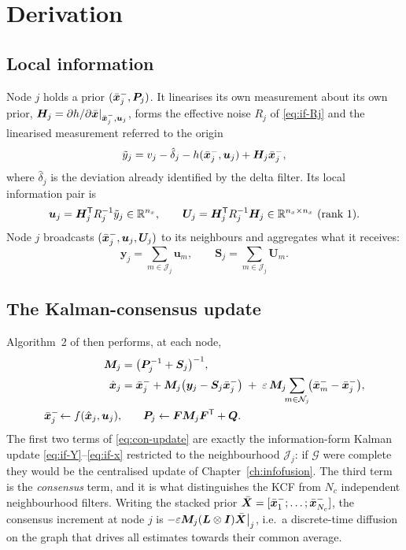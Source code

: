 \section{Derivation}

\subsection{Local information}
Node $j$ holds a prior $(\bar{\bm{x}}_j^-,\bm{P}_j)$. It linearises its own measurement about its own
prior, $\bm{H}_j = \partial h/\partial\bar{\bm{x}}|_{\bar{\bm{x}}_j^-,\bm{u}_j}$, forms the effective noise
$R_j$ of \eqref{eq:if-Rj} and the linearised measurement referred to the origin
\begin{equation}
\tilde y_j = v_j - \hat\delta_j - h(\bar{\bm{x}}_j^-,\bm{u}_j) + \bm{H}_j\bar{\bm{x}}_j^- ,
\label{eq:con-ytilde}
\end{equation}
where $\hat\delta_j$ is the deviation already identified by the delta filter. Its local
information pair is
\begin{equation}
\bm{u}_j = \bm{H}_j^{\mathsf{T}} R_j^{-1} \tilde y_j \in\mathbb{R}^{n_x},\qquad
\bm{U}_j = \bm{H}_j^{\mathsf{T}} R_j^{-1} \bm{H}_j \in\mathbb{R}^{n_x\times n_x}\ (\text{rank }1).
\label{eq:con-uU}
\end{equation}
Node $j$ broadcasts $(\bar{\bm{x}}_j^-, \bm{u}_j, \bm{U}_j)$ to its neighbours and aggregates what it
receives:
\begin{equation}
\bm{y}_j = \sum_{m\in\mathcal{J}_j}\bm{u}_m ,\qquad
\bm{S}_j = \sum_{m\in\mathcal{J}_j}\bm{U}_m .
\label{eq:con-agg}
\end{equation}

\subsection{The Kalman-consensus update}
Algorithm~2 of \cite{olfatisaber2007dkf} then performs, at each node,
\begin{align}
\bm{M}_j &= \big(\bm{P}_j^{-1} + \bm{S}_j\big)^{-1} , \label{eq:con-M}\\
\hat{\bm{x}}_j &= \bar{\bm{x}}_j^- + \bm{M}_j\big(\bm{y}_j - \bm{S}_j\bar{\bm{x}}_j^-\big)
 \;+\; \varepsilon\,\bm{M}_j\!\!\sum_{m\in\mathcal{N}_j}\!\!\big(\bar{\bm{x}}_m^- - \bar{\bm{x}}_j^-\big),
 \label{eq:con-update}\\
\bar{\bm{x}}_j^-\!\leftarrow f(\hat{\bm{x}}_j,\bm{u}_j),&\qquad \bm{P}_j \leftarrow \bm{F}\bm{M}_j\bm{F}^{\mathsf{T}} + \bm{Q} .
\label{eq:con-prop}
\end{align}
The first two terms of \eqref{eq:con-update} are exactly the information-form Kalman update
\eqref{eq:if-Y}--\eqref{eq:if-x} restricted to the neighbourhood $\mathcal{J}_j$: if
$\mathcal{G}$ were complete they would be the centralised update of Chapter~\ref{ch:infofusion}.
The third term is the \emph{consensus} term, and it is what distinguishes the KCF from $N_c$
independent neighbourhood filters. Writing the stacked prior
$\bar{\bm{X}}=[\bar{\bm{x}}_1^-;\dots;\bar{\bm{x}}_{N_c}^-]$, the consensus increment at node $j$ is
$-\varepsilon\bm{M}_j(\bm{L}\otimes\bm{I})\bar{\bm{X}}\big|_j$, i.e.\ a discrete-time diffusion on the
graph that drives all estimates towards their common average.

